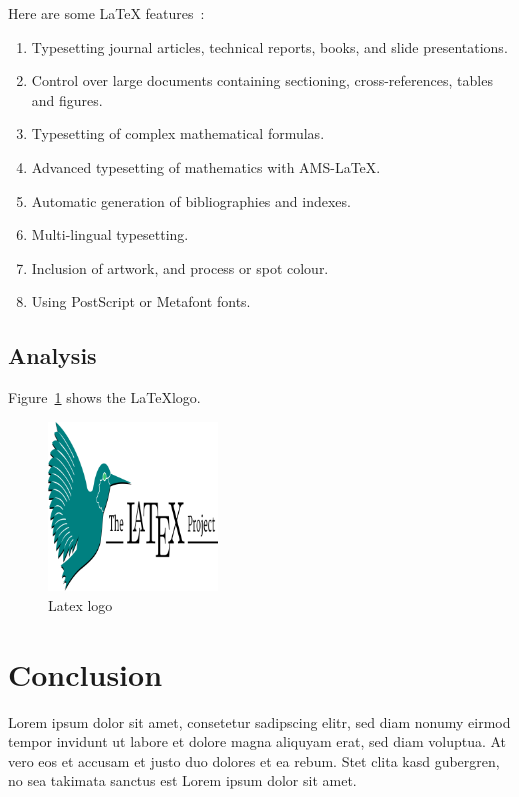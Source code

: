 \documentclass[12pt]{article}
\begin{document}
Here are some LaTeX features~\cite{latex-page}:

\begin{displayquote}
  \begin{enumerate}
    \item Typesetting journal articles, technical reports, books, and slide presentations.
    \item Control over large documents containing sectioning, cross-references, tables and figures.
    \item Typesetting of complex mathematical formulas.
    \item Advanced typesetting of mathematics with AMS-LaTeX.
    \item Automatic generation of bibliographies and indexes.
    \item Multi-lingual typesetting.
    \item Inclusion of artwork, and process or spot colour.
    \item Using PostScript or Metafont fonts.
  \end{enumerate}
\end{displayquote}

\subsection{Analysis}%

Figure~\ref{fig:-latex-logo} shows the \LaTeX logo.

\begin{figure}[htpb]
  \centering
  \includegraphics[width=0.4\textwidth]{./img/latex-project-logo.png}
  \caption{Latex logo}
\label{fig:-latex-logo}
\end{figure}

\section{Conclusion}%
\label{sec:conclusion}

Lorem ipsum dolor sit amet, consetetur sadipscing elitr, sed diam nonumy eirmod tempor invidunt ut labore et dolore magna aliquyam erat, sed diam voluptua. At vero eos et accusam et justo duo dolores et ea rebum. Stet clita kasd gubergren, no sea takimata sanctus est Lorem ipsum dolor sit amet.



\end{document}
